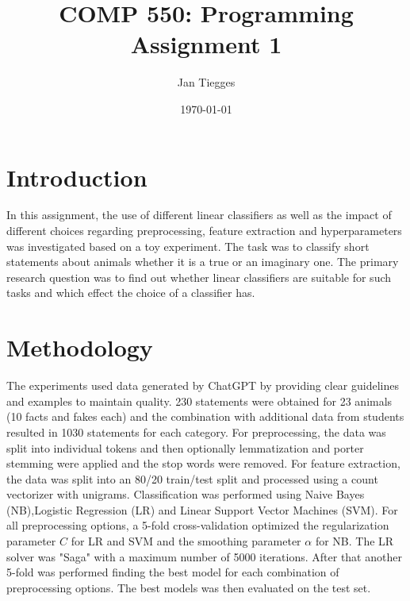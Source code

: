 \documentclass[12pt]{article}
\title{\textbf{COMP 550: Programming Assignment 1}}
\date{\today}
\author{Jan Tiegges}
\begin{document}
\maketitle

\section{Introduction}
In this assignment, the use of different linear classifiers as well as the impact of different choices regarding preprocessing, feature extraction and hyperparameters was investigated based on a toy experiment. The task was to classify short statements about animals whether it is a true or an imaginary one. The primary research question was to find out whether linear classifiers are suitable for such tasks and which effect the choice of a classifier has.


\section{Methodology}

The experiments used data generated by ChatGPT by providing clear guidelines and examples to maintain quality. 230 statements were obtained for 23 animals (10 facts and fakes each) and the combination with additional data from students resulted in 1030 statements for each category. For preprocessing, the data was split into individual tokens and then optionally lemmatization and porter stemming were applied and the stop words were removed. For feature extraction, the data was split into an 80/20 train/test split and processed using a count vectorizer with unigrams. Classification was performed using Naive Bayes (NB),Logistic Regression (LR) and Linear Support Vector Machines (SVM). For all preprocessing options, a 5-fold cross-validation optimized the regularization parameter $C$ for LR and SVM and the smoothing parameter $\alpha$ for NB. The LR solver was "Saga" with a maximum number of 5000 iterations. After that another 5-fold was performed finding the best model for each combination of preprocessing options. The best models was then evaluated on the test set.
\end{document}
